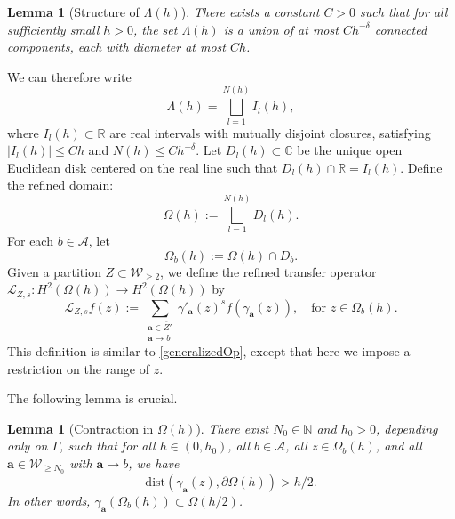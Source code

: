 \documentclass[12pt,letterpaper]{amsart}
\theoremstyle{plain}
\newtheorem{lemma}[prop]{Lemma}
\theoremstyle{definition}
\theoremstyle{remark}
\newcommand{\Aa}{\textbf{a}}
\newcommand{\CC}{\mathbb{C}}
\begin{document}
\begin{lemma}[Structure of $\Lambda(h)$]\label{lem:structureLambdah}
There exists a constant $C > 0$ such that for all sufficiently small $h > 0$, the set $\Lambda(h)$ is a union of at most $C h^{-\delta}$ connected components, each with diameter at most $Ch$.
\end{lemma}
We can therefore write
\begin{equation}\label{LambdaUnion}
\Lambda(h) = \bigsqcup_{l = 1}^{N(h)} I_l(h),
\end{equation}
where $I_l(h) \subset \mathbb{R}$ are real intervals with mutually disjoint closures, satisfying $|I_l(h)| \le Ch$ and $N(h) \le C h^{-\delta}$. Let $D_l(h) \subset \CC$ be the unique open Euclidean disk centered on the real line such that $D_l(h) \cap \mathbb{R} = I_l(h)$. Define the refined domain:
\begin{equation}\label{defi:omega(h)}
\Omega(h) := \bigsqcup_{l = 1}^{N(h)} D_l(h).
\end{equation}
For each $b \in \mathcal{A}$, let
\[
\Omega_b(h) := \Omega(h) \cap D_b.
\]
Given a partition $Z \subset \mathcal{W}_{\ge 2}$, we define the refined transfer operator $\mathcal{L}_{Z,s} \colon H^2(\Omega(h)) \to H^2(\Omega(h))$ by
\begin{equation}\label{refOpRefSpace}
\mathcal{L}_{Z,s}f(z) := \sum_{\substack{\Aa \in \overline{Z}' \\ \Aa \to b}} \gamma'_{\Aa}(z)^s f(\gamma_{\Aa}(z)), \quad \text{for } z \in \Omega_b(h).
\end{equation}
This definition is similar to \eqref{generalizedOp}, except that here we impose a restriction on the range of $z$. 


The following lemma is crucial. 

\begin{lemma}[Contraction in $\Omega(h)$]\label{lem:contractionInH}
There exist $N_0 \in \mathbb{N}$ and $h_0 > 0$, depending only on $\Gamma$, such that for all $h \in (0, h_0)$, all $b \in \mathcal{A}$, all $z \in \Omega_b(h)$, and all $\Aa \in \mathcal{W}_{\ge N_0}$ with $\Aa \to b$, we have
\[
\mathrm{dist}(\gamma_{\Aa}(z), \partial \Omega(h)) > h/2.
\]
In other words, $\gamma_{\Aa}(\Omega_b(h)) \subset \Omega(h/2)$.
\end{lemma}
\end{document}
